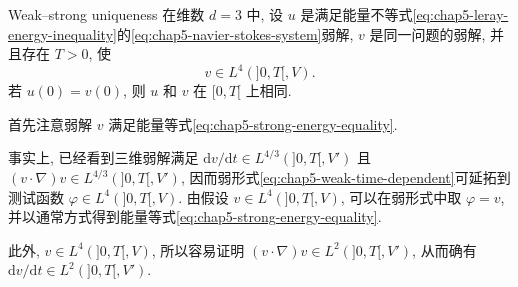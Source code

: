 \begin{Theorem}{Weak--strong uniqueness}
\label{thm:chap5-weak-strong-uniqueness}
在维数 $d=3$ 中, 设 $u$ 是满足能量不等式\eqref{eq:chap5-leray-energy-inequality}的\eqref{eq:chap5-navier-stokes-system}弱解, $v$ 是同一问题的弱解, 并且存在 $T>0$, 使
\begin{equation}
 v\in L^4(]0,T[,V).
\label{eq:chap5-weak-strong-l4-condition}
\end{equation}
若 $u(0)=v(0)$, 则 $u$ 和 $v$ 在 $[0,T[$ 上相同.
\end{Theorem}

\begin{Proof}
首先注意弱解 $v$ 满足能量等式\eqref{eq:chap5-strong-energy-equality}.

事实上, 已经看到三维弱解满足 $\mathrm dv/\mathrm dt\in L^{4/3}(]0,T[,V')$ 且 $(v\cdot\nabla)v\in L^{4/3}(]0,T[,V')$, 因而弱形式\eqref{eq:chap5-weak-time-dependent}可延拓到测试函数 $\varphi\in L^4(]0,T[,V)$. 由假设 $v\in L^4(]0,T[,V)$, 可以在弱形式中取 $\varphi=v$, 并以通常方式得到能量等式\eqref{eq:chap5-strong-energy-equality}.

此外, $v\in L^4(]0,T[,V)$, 所以容易证明 $(v\cdot\nabla)v\in L^2(]0,T[,V')$, 从而确有 $\mathrm dv/\mathrm dt\in L^2(]0,T[,V')$.


\end{Proof}
